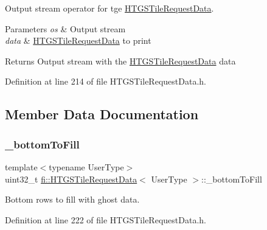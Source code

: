 Output stream operator for tge \hyperlink{classfi_1_1HTGSTileRequestData}{H\+T\+G\+S\+Tile\+Request\+Data}. 


\begin{DoxyParams}{Parameters}
{\em os} & Output stream \\
\hline
{\em data} & \hyperlink{classfi_1_1HTGSTileRequestData}{H\+T\+G\+S\+Tile\+Request\+Data} to print \\
\hline
\end{DoxyParams}
\begin{DoxyReturn}{Returns}
Output stream with the \hyperlink{classfi_1_1HTGSTileRequestData}{H\+T\+G\+S\+Tile\+Request\+Data} data 
\end{DoxyReturn}


Definition at line 214 of file H\+T\+G\+S\+Tile\+Request\+Data.\+h.



\subsection{Member Data Documentation}
\mbox{\label{classfi_1_1HTGSTileRequestData_ad34befb6db36b5207ffbd4d3c1b4fffb}} 
\subsubsection{\texorpdfstring{\+\_\+bottom\+To\+Fill}{\_bottomToFill}}
{\footnotesize\ttfamily template$<$typename User\+Type$>$ \\
uint32\+\_\+t \hyperlink{classfi_1_1HTGSTileRequestData}{fi\+::\+H\+T\+G\+S\+Tile\+Request\+Data}$<$ User\+Type $>$\+::\+\_\+bottom\+To\+Fill\hspace{0.3cm}{\ttfamily [private]}}



Bottom rows to fill with ghost data. 



Definition at line 222 of file H\+T\+G\+S\+Tile\+Request\+Data.\+h.

\mbox{\label{classfi_1_1HTGSTileRequestData_a3039cfe51208325fa4a54eb12320fd16}} 

